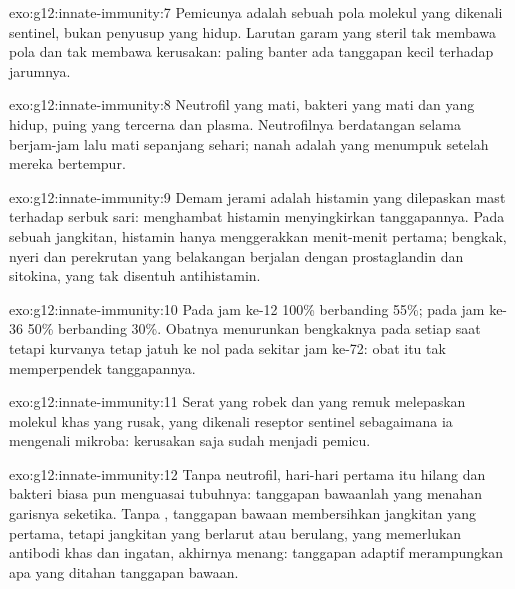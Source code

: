 \begin{solution}{exo:g12:innate-immunity:7}
Pemicunya adalah sebuah pola molekul yang dikenali  sentinel, bukan
penyusup yang hidup. Larutan garam yang steril tak membawa pola dan tak
membawa kerusakan: paling banter ada tanggapan kecil terhadap jarumnya.
\end{solution}

\begin{solution}{exo:g12:innate-immunity:8}
Neutrofil yang mati, bakteri yang mati dan yang hidup, puing yang
tercerna dan plasma. Neutrofilnya berdatangan selama berjam-jam lalu
mati sepanjang sehari; nanah adalah yang menumpuk setelah mereka
bertempur.
\end{solution}

\begin{solution}{exo:g12:innate-immunity:9}
Demam jerami adalah histamin yang dilepaskan  mast terhadap serbuk
sari: menghambat histamin menyingkirkan tanggapannya. Pada sebuah
jangkitan, histamin hanya menggerakkan menit-menit pertama; bengkak,
nyeri dan perekrutan yang belakangan berjalan dengan prostaglandin dan
sitokina, yang tak disentuh antihistamin.
\end{solution}

\begin{solution}{exo:g12:innate-immunity:10}
Pada jam ke-12 100\% berbanding 55\%; pada jam ke-36 50\% berbanding
30\%. Obatnya menurunkan bengkaknya pada setiap saat tetapi kurvanya
tetap jatuh ke nol pada sekitar jam ke-72: obat itu tak memperpendek
tanggapannya.
\end{solution}

\begin{solution}{exo:g12:innate-immunity:11}
Serat  yang robek dan  yang remuk melepaskan molekul khas 
yang rusak, yang dikenali reseptor  sentinel sebagaimana ia
mengenali mikroba: kerusakan saja sudah menjadi pemicu.
\end{solution}

\begin{solution}{exo:g12:innate-immunity:12}
Tanpa neutrofil, hari-hari pertama itu hilang dan bakteri biasa pun
menguasai tubuhnya: tanggapan bawaanlah yang menahan garisnya seketika.
Tanpa , tanggapan bawaan membersihkan jangkitan yang
pertama, tetapi jangkitan yang berlarut atau berulang, yang memerlukan
antibodi khas dan ingatan, akhirnya menang: tanggapan adaptif
merampungkan apa yang ditahan tanggapan bawaan.
\end{solution}

